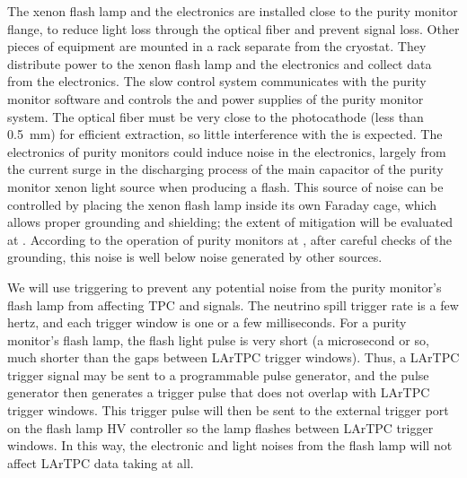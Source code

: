 The xenon flash lamp and the  electronics are installed close to the purity monitor flange, to reduce light loss through the optical fiber and prevent signal loss. Other pieces of equipment are mounted in a rack separate from the cryostat. They distribute power to the xenon flash lamp and the  electronics and collect data from the electronics. The slow control system communicates with the purity monitor  software and controls  the  and  power supplies of the purity monitor system. The optical fiber must be very close to the photocathode (less than \SI{0.5}{\milli\meter}) for efficient \phel extraction, so little interference with the  is expected. 
The electronics of purity monitors could induce noise in the  electronics, largely from the current surge in the discharging process of the main capacitor of the purity monitor xenon light source when producing a flash.  This source of noise can be controlled by placing the xenon flash lamp inside its own Faraday cage, which allows proper grounding and shielding; the extent of mitigation will be evaluated at . According to the operation of purity monitors at , after careful checks of the grounding, this noise is well below noise generated by other sources.

We will use triggering to prevent any potential noise from the purity monitor's flash lamp from affecting TPC and  signals. The neutrino spill trigger rate is a few hertz, and each trigger window is one or a few milliseconds. For a purity monitor's flash lamp,  the flash light pulse is very short (a microsecond or so, much shorter than the gaps between LArTPC trigger windows). Thus, a LArTPC trigger signal may be sent to a programmable pulse generator, and the pulse generator then generates a trigger pulse that does not overlap with LArTPC trigger windows. This trigger pulse will then be sent to the external trigger port on the flash lamp HV controller so the lamp flashes between LArTPC trigger windows. In this way, the electronic and light noises from the flash lamp will not affect LArTPC data taking at all.


